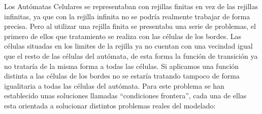 Los Autómatas Celulares se representaban con rejillas finitas en vez de las rejillas infinitas, ya que con la rejilla infinita no se podría realmente trabajar de forma precisa. Pero al utilizar una rejilla finita se presentaba una serie de problemas, el primero de ellos que tratamiento se realiza con las células de los bordes. Las células situadas en los limites de la rejilla ya no cuentan con una vecindad igual que el resto de las células del autómata, de esta forma la función de transición ya no trataría de la misma forma a todas las células. Si aplicamos una función  distinta a las células de los bordes no se estaría tratando tampoco de forma igualitaria a todas las células del autómata. Para este problema se han establecido unas soluciones llamadas ``condiciones frontera'', cada una de ellas esta orientada a solucionar distintos problemas reales del modelado:
